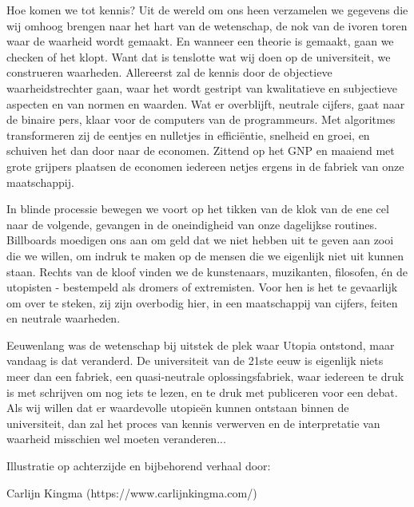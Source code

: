 \documentclass[openright,titlepage,12pt,a4paper]{book}
\begin{document}
Hoe komen we tot kennis? Uit de wereld om ons heen verzamelen we gegevens die wij omhoog brengen naar het hart van de wetenschap, de nok van de ivoren toren waar de waarheid wordt gemaakt. En wanneer een theorie is gemaakt, gaan we checken of het klopt. Want dat is tenslotte wat wij doen op de universiteit, we construeren waarheden. Allereerst zal de kennis door de objectieve waarheidstrechter gaan, waar het wordt gestript van kwalitatieve en subjectieve aspecten en van normen en waarden. Wat er overblijft, neutrale cijfers, gaat naar de binaire pers, klaar voor de computers van de programmeurs. Met algoritmes transformeren zij de eentjes en nulletjes in efficiëntie, snelheid en groei, en schuiven het dan door naar de economen. Zittend op het GNP en maaiend met grote grijpers plaatsen de economen iedereen netjes ergens in de fabriek van onze maatschappij.

In blinde processie bewegen we voort op het tikken van de klok van de ene cel naar de volgende, gevangen in de oneindigheid van onze dagelijkse routines. Billboards moedigen ons aan om geld dat we niet hebben uit te geven aan zooi die we willen, om indruk te maken op de mensen die we eigenlijk niet uit kunnen staan. Rechts van de kloof vinden we de kunstenaars, muzikanten, filosofen, én de utopisten - bestempeld als dromers of extremisten. Voor hen is het te gevaarlijk om over te steken, zij zijn overbodig hier, in een maatschappij van cijfers, feiten en neutrale waarheden.

Eeuwenlang was de wetenschap bij uitstek de plek waar Utopia ontstond, maar vandaag is dat veranderd. De universiteit van de 21ste eeuw is eigenlijk niets meer dan een fabriek, een quasi-neutrale oplossingsfabriek, waar iedereen te druk is met schrijven om nog iets te lezen, en te druk met publiceren voor een debat. Als wij willen dat er waardevolle utopieën kunnen ontstaan binnen de universiteit, dan zal het proces van kennis verwerven en de interpretatie van waarheid misschien wel moeten veranderen...

\vspace*{\fill}

Illustratie op achterzijde en bijbehorend verhaal door:

Carlijn Kingma (https://www.carlijnkingma.com/)

\newpage


% 
\end{document}
